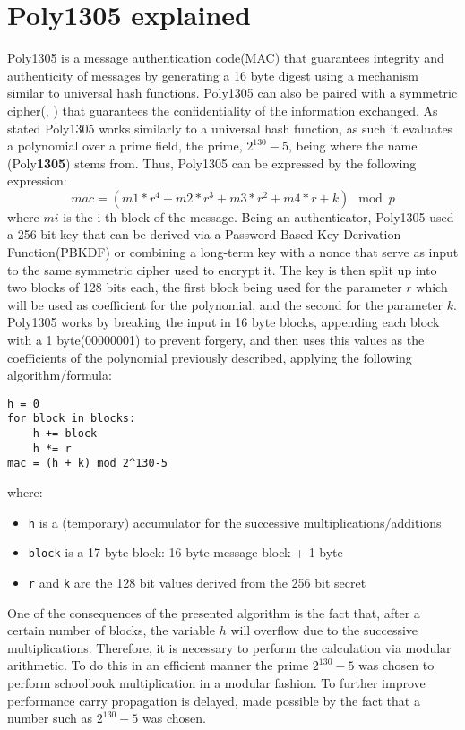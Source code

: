 \documentclass{article}
\begin{document}
\section{Poly1305 explained}
\label{poly135_101}
Poly1305 is a message authentication code(MAC) that guarantees integrity and authenticity of messages by generating a 16 byte digest using a mechanism similar
to universal hash functions. Poly1305 can also be paired with a symmetric cipher(\cite{poly1305_aes_bernstein}, \cite{poly1305_chacha20_iot}) 
that guarantees the confidentiality of the information exchanged. 
As stated Poly1305 works similarly to a universal hash function, as such it evaluates a polynomial over a prime field, the prime, $2^{130}-5$, being where the 
name (Poly\textbf{1305}) stems from. Thus, Poly1305 can be expressed by the following expression: 
$$mac = (m1 * r^4 + m2 * r^3 + m3 * r^2 + m4 * r + k) \mod{p} $$ 
where $mi$ is the i-th block of the message. Being an authenticator,  Poly1305 used a 256 bit key that can be derived via a Password-Based Key Derivation Function(PBKDF)
or combining a long-term key with a nonce that serve as input to the same symmetric cipher used to encrypt it. The key is then split up into two blocks of 128 
bits each, the first block being used for the parameter $r$ which will be used as coefficient for the polynomial, and the second for the parameter $k$. 
Poly1305 works by breaking the input in 16 byte blocks, appending each block with a 1 byte(00000001) to prevent forgery, and then uses this values as the 
coefficients of the polynomial previously described, applying the following algorithm/formula:

\begin{Verbatim}[fontsize=\footnotesize]
h = 0
for block in blocks:
    h += block
    h *= r
mac = (h + k) mod 2^130-5
\end{Verbatim}

where:
\begin{itemize}
    \item \texttt{h} is a (temporary) accumulator for the successive multiplications/additions
    \item \texttt{block} is a 17 byte block: 16 byte message block + 1 byte
    \item \texttt{r} and \texttt{k} are the 128 bit values derived from the 256 bit secret
\end{itemize}

One of the consequences of the presented algorithm is the fact that, after a certain number of blocks, the variable $h$ will overflow due to the successive multiplications.
Therefore, it is necessary to perform the calculation via modular arithmetic. To do this in an efficient manner the prime $2^{130}-5$ was chosen to perform schoolbook 
multiplication in a modular fashion. To further improve performance carry propagation is delayed, made possible by the fact that a number such as $2^{130}-5$ was chosen.
\end{document}
